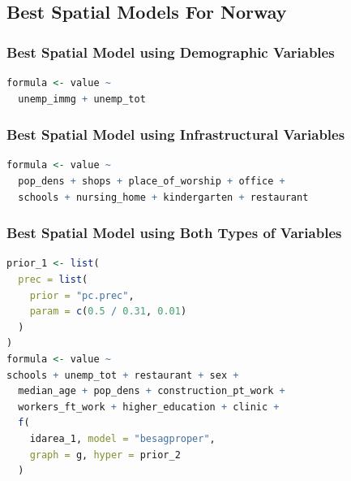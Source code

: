 \subsection{Best Spatial Models For Norway}
\subsubsection{Best Spatial Model using Demographic Variables}
\begin{lstlisting}[caption={The code for the demographic model.}, label={codeDemoNorway}, language = R]
formula <- value ~
  unemp_immg + unemp_tot
\end{lstlisting}
\subsubsection{Best Spatial Model using Infrastructural Variables}
\begin{lstlisting}[caption={The code for the infrastructural model.}, label={codeInfraNorway}, language = R]
formula <- value ~
  pop_dens + shops + place_of_worship + office +
  schools + nursing_home + kindergarten + restaurant 
\end{lstlisting}
\subsubsection{Best Spatial Model using Both Types of Variables}
\begin{lstlisting}[caption={The code for the demographic + infrastructure model.}, label={codeBothNorway}, language=R]
prior_1 <- list(
  prec = list(
    prior = "pc.prec",
    param = c(0.5 / 0.31, 0.01)
  )
)
formula <- value ~
schools + unemp_tot + restaurant + sex +
  median_age + pop_dens + construction_pt_work +
  workers_ft_work + higher_education + clinic +
  f(
    idarea_1, model = "besagproper",
    graph = g, hyper = prior_2
  )
\end{lstlisting}
\clearpage